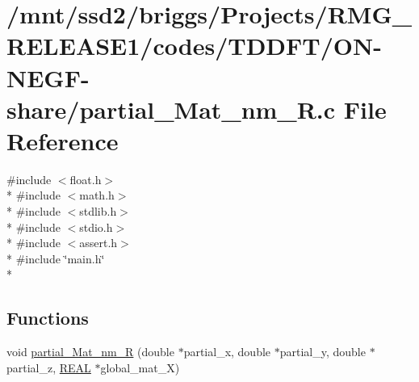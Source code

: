 \hypertarget{_t_d_d_f_t_2_o_n-_n_e_g_f-share_2partial___mat__nm___r_8c}{\section{/mnt/ssd2/briggs/\-Projects/\-R\-M\-G\-\_\-\-R\-E\-L\-E\-A\-S\-E1/codes/\-T\-D\-D\-F\-T/\-O\-N-\/\-N\-E\-G\-F-\/share/partial\-\_\-\-Mat\-\_\-nm\-\_\-\-R.c File Reference}
\label{_t_d_d_f_t_2_o_n-_n_e_g_f-share_2partial___mat__nm___r_8c}
}
{\ttfamily \#include $<$float.\-h$>$}\\*
{\ttfamily \#include $<$math.\-h$>$}\\*
{\ttfamily \#include $<$stdlib.\-h$>$}\\*
{\ttfamily \#include $<$stdio.\-h$>$}\\*
{\ttfamily \#include $<$assert.\-h$>$}\\*
{\ttfamily \#include \char`\"{}main.\-h\char`\"{}}\\*
\subsection*{Functions}
\begin{DoxyCompactItemize}
\item 
void \hyperlink{_t_d_d_f_t_2_o_n-_n_e_g_f-share_2partial___mat__nm___r_8c_a4db26cadbb9eac815c9152d5264aaf13}{partial\-\_\-\-Mat\-\_\-nm\-\_\-\-R} (double $\ast$partial\-\_\-x, double $\ast$partial\-\_\-y, double $\ast$partial\-\_\-z, \hyperlink{md_8h_a4b654506f18b8bfd61ad2a29a7e38c25}{R\-E\-A\-L} $\ast$global\-\_\-mat\-\_\-\-X)
\end{DoxyCompactItemize}


